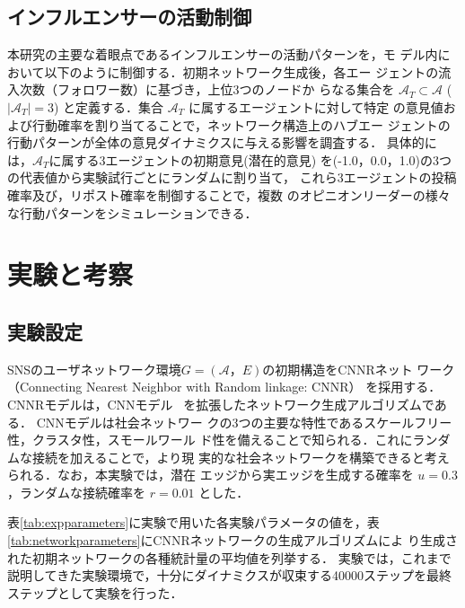 \documentclass[a4j]{ujarticle}
\def\AgentSet{\mathcal{A}}
\begin{document}
\subsection{インフルエンサーの活動制御}
本研究の主要な着眼点であるインフルエンサーの活動パターンを，モ
デル内において以下のように制御する．初期ネットワーク生成後，各エー
ジェントの流入次数（フォロワー数）に基づき，上位3つのノードか
らなる集合を $\AgentSet_{T} \subset \AgentSet$ ($|\AgentSet_{T}| = 3$)
と定義する．集合 $\AgentSet_{T}$ に属するエージェントに対して特定
の意見値および行動確率を割り当てることで，ネットワーク構造上のハブエー
ジェントの行動パターンが全体の意見ダイナミクスに与える影響を調査する．
具体的には，$\AgentSet_{T}$に属する3エージェントの初期意見(潜在的意見)
を(-1.0，0.0，1.0)の3つの代表値から実験試行ごとにランダムに割り当て，
これら3エージェントの投稿確率及び，リポスト確率を制御することで，複数
のオピニオンリーダーの様々な行動パターンをシミュレーションできる．


\section{実験と考察}
\subsection{実験設定}
SNSのユーザネットワーク環境$G = (\AgentSet，E)$の初期構造をCNNRネット
ワーク（Connecting Nearest Neighbor with Random linkage: CNNR）
\cite{Yuta2007}を採用する．CNNRモデルは，CNNモデル~\cite{Vazquez2003}
を拡張したネットワーク生成アルゴリズムである． CNNモデルは社会ネットワー
クの3つの主要な特性であるスケールフリー性，クラスタ性，スモールワール
ド性を備えることで知られる．これにランダムな接続を加えることで，より現
実的な社会ネットワークを構築できると考えられる．なお，本実験では，潜在
エッジから実エッジを生成する確率を $u = 0.3$，ランダムな接続確率を $r
= 0.01$ とした．
\par


表\ref{tab:expparameters}に実験で用いた各実験パラメータの値を，表
\ref{tab:networkparameters}にCNNRネットワークの生成アルゴリズムによ
り生成された初期ネットワークの各種統計量の平均値を列挙する．
実験では，これまで説明してきた実験環境で，十分にダイナミクスが収束する40000ステップを最終ステップとして実験を行った．
\par
\end{document}
